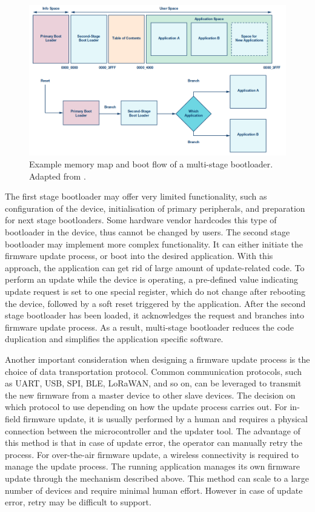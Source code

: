 \begin{figure}[H]
    \centering
    \includegraphics[scale=0.4]{figure/figure06_ssbl.png}
    \caption{Example memory map and boot flow of a multi-stage bootloader.
    Adapted from \cite{ben18}.}
\end{figure}
\justify
The first stage bootloader may offer very limited functionality, such as configuration
of the device, initialisation of primary peripherals, and preparation for next stage
bootloaders. Some hardware vendor hardcodes this type of bootloader in the device,
thus cannot be changed by users. The second stage bootloader may implement more
complex functionality. It can either initiate the firmware update process, or boot 
into the desired application. With this approach, the application can get rid of large
amount of update-related code. To perform an update while the device is operating,
a pre-defined value indicating update request is set to one special register, which 
do not change after rebooting the device, followed by a soft reset triggered by the
application. After the second stage bootloader has been loaded, it acknowledges the 
request and branches into firmware update process. As a result, multi-stage
bootloader reduces the code duplication and simplifies the application specific 
software. 

\justify
Another important consideration when designing a firmware update process is the 
choice of data transportation protocol. Common communication protocols, such as 
UART, USB, SPI, BLE, LoRaWAN, and so on, can be leveraged to transmit the new 
firmware from a master device to other slave devices. The decision on which protocol 
to use depending on how the update process carries out. For in-field firmware update, 
it is usually performed by a human and requires a physical connection between the 
microcontroller and the updater tool. The advantage of this method is that in case
of update error, the operator can manually retry the process. For over-the-air 
firmware update, a wireless connectivity is required to manage the update process.
The running application manages its own firmware update through the mechanism 
described above. This method can scale to a large number of devices and require 
minimal human effort. However in case of update error, retry may be difficult
to support.

